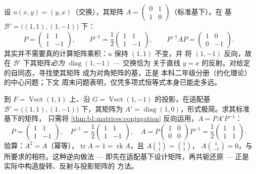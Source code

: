 \begin{example}[好的基使映射一目了然]
\label{ex:b1:matrices:conjugationrun}
设 $u(x, y) = (y, x)$（交换），其矩阵 $A = \begin{pmatrix} 0
& 1\\ 1 & 0\end{pmatrix}$（标准基下）。在
基 $\mathcal B' = \bigl((1,1), (1,-1)\bigr)$ 下：
\[
P = \begin{pmatrix} 1 & 1\\ 1 & -1 \end{pmatrix},
\qquad
P^{-1} = \frac12\begin{pmatrix} 1 & 1\\ 1 & -1 \end{pmatrix},
\qquad
P^{-1} A P = \begin{pmatrix} 1 & 0\\ 0 & -1 \end{pmatrix}.
\]
其实并不需要真的计算矩阵乘积：$u$ 保持 $(1,1)$ 不变，并
将 $(1,-1)$ 反向，故在 $\mathcal B'$ 下其矩阵\emph{必为}
$\operatorname{diag}(1, -1)$ --- 交换恰为
关于直线 $y = x$ 的反射。对给定的自同态，寻找使其矩阵
成为对角矩阵的基，正是
本科二年级分册（约化理论）的中心问题；下文
周末问题表明，仅凭多项式恒等式本身已能走多远。
\end{example}

\begin{example}
\label{ex:b1:matrices:reverserun}
到 $F = \operatorname{Vect}(1,1)$ 上、沿 $G =
\operatorname{Vect}(1,-1)$ 的投影，在适配基 $\mathcal
B' = \bigl((1,1),(1,-1)\bigr)$ 下，其矩阵为 $A' =
\operatorname{diag}(1, 0)$，形式极简。求其标准基下的矩阵，
只需将 \cref{thm:b1:matrices:conjugation} 反向运用，$A = P A'
P^{-1}$：
\[
P = \begin{pmatrix} 1 & 1\\ 1 & -1\end{pmatrix},
\quad
P^{-1} = \frac12\begin{pmatrix} 1 & 1\\ 1 & -1\end{pmatrix},
\quad
A = P\begin{pmatrix} 1 & 0\\ 0 & 0\end{pmatrix}P^{-1}
= \frac12\begin{pmatrix} 1 & 1\\ 1 & 1\end{pmatrix}.
\]
验算：$A^2 = A$（幂等），$\operatorname{tr} A = 1 =
\operatorname{rk} A$，且 $A\binom{1}{1} = \binom11$，
$A\binom{1}{-1} = 0$，与所要求的相符。这种逆向做法 ---
即先在适配基下设计矩阵，再共轭还原 ---
正是实际中构造旋转、反射与投影矩阵的
方法。
\end{example}

